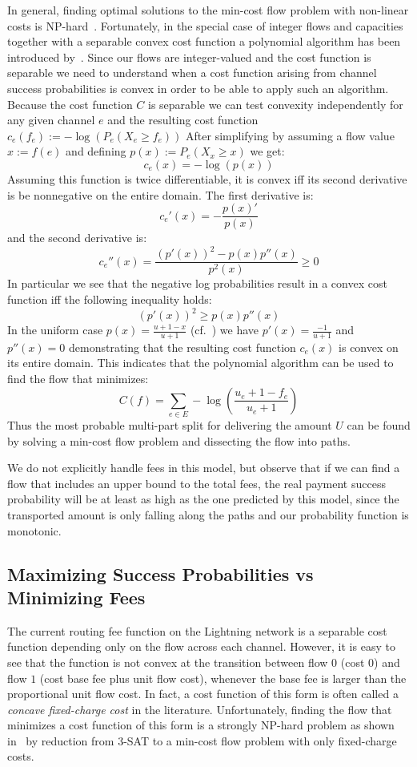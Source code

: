 \documentclass[10pt,twocolumn]{article}
\begin{document}
In general, finding optimal solutions to the min-cost flow problem with non-linear costs is NP-hard~\cite{guisewite1990minimum}. Fortunately, in the special case of integer flows and capacities together with a separable convex cost function a polynomial algorithm has been introduced by~\cite{Minoux1986}.
Since our flows are integer-valued and the cost function is separable we need to understand when a cost function arising from channel success probabilities is convex in order to be able to apply such an algorithm.
Because the cost function $C$ is separable we can test convexity independently for any given channel $e$ and the resulting cost function $c_e(f_e):=-\log\left(P_e(X_e\geq f_e)\right)$
After simplifying by assuming a flow value $x:=f(e)$ and defining $p(x):=P_e(X_x\geq x)$ we get:
\[
c_e(x)=-\log(p(x))
\]
Assuming this function is twice differentiable, it is convex iff its second derivative is be nonnegative on the entire domain.
The first derivative is:
\[
c_e'(x) = -\frac{p(x)'}{p(x)}
\]
and the second derivative is:
\[
c_e''(x) = \frac{(p'(x))^2-p(x)p''(x)}{{p^2(x)}} \geq 0
\]
In particular we see that the negative log probabilities result in a convex cost function iff the following inequality holds:
\[
(p'(x))^2 \geq p(x)p''(x)
\]
In the uniform case $p(x)=\frac{u+1-x}{u+1}$ (cf.~\cite{pickhardt2021security}) we have $p'(x)=\frac{-1}{u+1}$ and $p''(x)=0$ demonstrating that the resulting cost function $c_e(x)$ is convex on its entire domain.
This indicates that the polynomial algorithm can be used to find the flow that minimizes:
\[
C(f)=\sum_{e\in E}-\log\left(\frac{u_{e}+1-f_e}{u_{e}+1}\right)
\]
Thus the most probable multi-part split for delivering the amount $U$ can be found by solving a min-cost flow problem and dissecting the flow into paths.

We do not explicitly handle fees in this model, but observe that if we can find a flow that includes an upper bound to the total fees, the real payment success probability will be at least as high as the one predicted by this model, since the transported amount is only falling along the paths and our probability function is monotonic.

\subsection{Maximizing Success Probabilities vs Minimizing Fees}
\label{fees}
The current routing fee function on the Lightning network is a separable cost function depending only on the flow across each channel.
However, it is easy to see that the function is not convex at the transition between flow $0$ (cost $0$) and flow $1$ (cost base fee plus unit flow cost), whenever the base fee is larger than the proportional unit flow cost. In fact, a cost function of this form is often called a \emph{concave fixed-charge cost} in the literature. Unfortunately, finding the flow that minimizes a cost function of this form is a strongly NP-hard problem as shown in~\cite{guisewite1990minimum} by reduction from 3-SAT to a min-cost flow problem with only fixed-charge costs.
\end{document}
